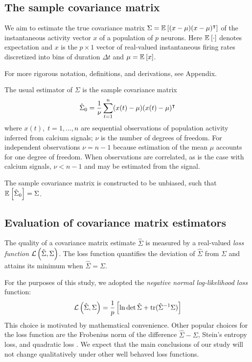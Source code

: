 \subsection*{The sample covariance matrix}
We aim to estimate the true covariance matrix $\Sigma = \mathbb E_{}\left[ (x-\mu)(x-\mu)^\intercal\right]$ of the instantaneous activity vector $x$ of a population of $p$ neurons. Here $\mathbb E_{}\left[ \cdot\right]$ denotes expectation  and $x$ is the $p\times 1$ vector of real-valued instantaneous firing rates discretized into bins of duration $\Delta t$ and $\mu = \mathbb E_{}\left[ x\right]$.  

For more rigorous notation, definitions, and derivations, see Appendix. 

The usual estimator of $\Sigma$ is the sample covariance matrix
\begin{equation}
\hat \Sigma_0 = \frac 1 \nu \sum\limits_{t=1}^n (x(t)-\mu)(x(t)-\mu)^\intercal 
\end{equation}
where $x(t),\;t=1,\ldots,n$ are sequential observations of population activity inferred from calcium signals; $\nu$ is the number of degrees of freedom. For independent observations $\nu=n-1$ because estimation of the mean $\mu$ accounts for one degree of freedom. When observations are correlated, as is the case with calcium signals, $\nu < n-1$ and may be estimated from the signal. 

The sample covariance matrix is constructed to be unbiased, such that $\mathbb E_{}\left[ \hat\Sigma_0\right] = \Sigma$. 

\subsection*{Evaluation of covariance matrix estimators}
The quality of a covariance matrix estimate $\hat\Sigma$ is measured by a real-valued \emph{loss function} $\mathcal L\left(\hat\Sigma,\Sigma\right)$.  The loss function quantifies the deviation of $\hat\Sigma$ from $\Sigma$ and attains its minimum  when $\hat\Sigma = \Sigma$. 

For the purposes of this study, we adopted the \emph{negative normal log-likelihood loss} function:
\begin{equation}\label{eq:loss}
\mathcal L\left(\hat\Sigma,\Sigma\right) = \frac 1 p\left[\ln \det \hat \Sigma + \operatorname{tr}(\hat \Sigma^{-1}\Sigma)\right]
\end{equation}
This choice is motivated by mathematical convenience. Other popular choices for the loss function are the Frobenius norm of the difference $\hat\Sigma-\Sigma$, Stein's entropy loss, and quadratic loss \cite{James:1961,Ledoit:2004,Schafer:2005,Fan:2008}.  We expect that the main conclusions of our study will not change qualitatively under other well behaved loss functions.


